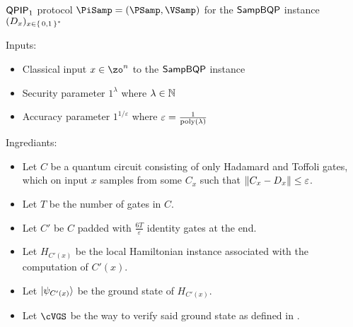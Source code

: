 \begin{protocol}{$\operatorname{\mathsf{QPIP}}_1$ protocol $\PiSamp=(\PSamp, \VSamp)$ for the $\operatorname{\mathsf{SampBQP}}$ instance $(D_x)_{x\in\set{0, 1}^*}$}
	\label{ProtoQPIP1}

	Inputs:
	\begin{itemize}
		\item Classical input $x\in\zo^n$ to the $\operatorname{\mathsf{SampBQP}}$ instance
		\item Security parameter $1^\lambda$ where $\lambda\in\mathbb{N}$
		\item Accuracy parameter $1^{1/\varepsilon}$ where $\varepsilon=\frac{1}{\operatorname*{\operatorname{poly}}(\lambda)}$ 
	\end{itemize}

	Ingrediants:
	\begin{itemize}
		\item Let $C$ be a quantum circuit consisting of only Hadamard and Toffoli gates, which on input $x$ samples from some $C_x$ such that $\left\lVert C_x-D_x\right\rVert\leq\varepsilon$.
		\item Let $T$ be the number of gates in $C$.
		\item Let $C'$ be $C$ padded with $\frac{6T}{\varepsilon}$ identity gates at the end.
		\item Let $H_{C'(x)}$ be the local Hamiltonian instance associated with the computation of $C'(x)$.
		\item Let $\ket{\psi_{C'(x)}}$ be the ground state of $H_{C'(x)}$.
		\item Let $\cVGS$ be the way to verify said ground state as defined in . 
	\end{itemize}


\end{protocol}
